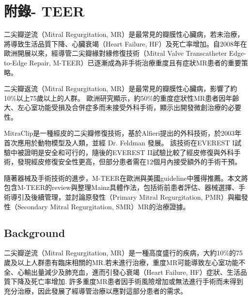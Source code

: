 \documentclass[nols]{tufte-book}
\begin{document}
\maketitle

\chapter{附錄- TEER}


二尖瓣逆流（Mitral Regurgitation, MR）是最常見的瓣膜性心臟病，若未治療，將導致生活品質下降、心臟衰竭（Heart Failure, HF）及死亡率增加。自2008年在歐洲開展以來，經導管二尖瓣緣對緣修復技術（Mitral Valve Transcatheter Edge-to-Edge Repair, M-TEER）已逐漸成為非手術治療重度且有症狀MR患者的重要策略。

二尖瓣返流（Mitral Regurgitation, MR）是最常見的瓣膜性心臟病，影響了約10\%以上75歲以上的人群。
歐洲研究顯示，約50\%的重度症狀性MR患者因年齡大、左心室功能受損及合併症多而未接受外科手術，顯示出開發微創治療的必要性。\cite{Puls2016}

MitraClip是一種經皮的二尖瓣修復技術，基於Alfieri提出的外科技術，於2003年首次應用於動物模型及人類，並經 Dr. Feldman 發展。
該技術在EVEREST I試驗中被證明是安全和可行的，隨後的EVEREST II試驗比較了經皮修復與外科手術，發現經皮修復安全性更高，但部分患者需在12個月內接受額外的手術干預。\cite{Feldman2005}

隨著器械及手術技術的進步，M-TEER在歐洲與美國guideline中獲得推薦。本文將包含M-TEER的review與整理Mainz具體作法，包括術前患者評估、器械選擇、手術導引及後續管理，並討論原發性（Primary Mitral Regurgitation, PMR）與繼發性（Secondary Mitral Regurgitation, SMR）MR的治療證據。


\section{Background}
二尖瓣逆流（Mitral Regurgitation, MR）是一種高度盛行的疾病，大約10\%的75歲及以上人群患有臨床相關的MR\cite{Hausleiter2023, Hausleiter2023a}.若未進行治療，重度MR可能導致左心室功能不全、心輸出量減少及肺充血，進而引發心衰竭（Heart Failure, HF）症狀、生活品質下降及死亡率增加.\cite{Goel2014} 許多重度MR患者因手術風險增加或無法進行手術而未得到充分治療，因此發展了經導管治療以應對這部分患者的需求。\cite{Nkomo2006}

\end{document}
